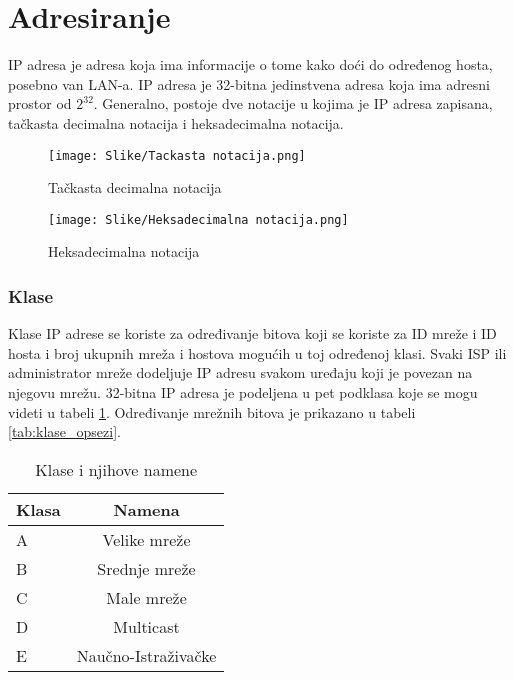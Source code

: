 \section{Adresiranje}
IP adresa je adresa koja ima informacije o tome kako do\'{c}i do određenog hosta, posebno van LAN-a. IP adresa je 32-bitna jedinstvena adresa koja ima adresni prostor od $2^{32}$. Generalno, postoje dve notacije u kojima je IP adresa zapisana, tačkasta decimalna notacija i heksadecimalna notacija.

\begin{figure}[H]
    \centering
    \texttt{[image: Slike/Tackasta notacija.png]}
    \caption{Tačkasta decimalna notacija}
    \label{fig:ip_adresiranje}
\end{figure}

\begin{figure}[H]
    \centering
    \texttt{[image: Slike/Heksadecimalna notacija.png]}
    \caption{Heksadecimalna notacija}
    \label{fig:heksadecimalna_notacija}
\end{figure}

\subsubsection{Klase}

Klase IP adrese se koriste za određivanje bitova koji se koriste za ID mreže i ID hosta i broj ukupnih mreža i hostova mogu\'{c}ih u toj određenoj klasi. Svaki ISP ili administrator mreže dodeljuje IP adresu svakom uređaju koji je povezan na njegovu mrežu. 32-bitna IP adresa je podeljena u pet podklasa koje se mogu videti u tabeli \ref{tab:klase_namene}. Određivanje mrežnih bitova je prikazano u tabeli \ref{tab:klase_opsezi}.\\

\begin{table}[]
    \begin{center}
    \begin{tabular}{lc}
    Klasa & Namena              \\ \hline\hline
    A     & Velike mreže        \\
    B     & Srednje mreže       \\
    C     & Male mreže          \\
    D     & Multicast           \\
    E     & Naučno-Istraživačke
    \end{tabular}
    \caption{Klase i njihove namene}
    \label{tab:klase_namene}
    \end{center}
\end{table}



